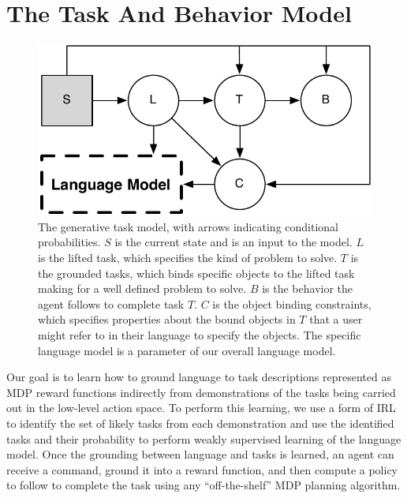 \documentclass[conference]{IEEEtran}
\begin{document}
\section{The Task And Behavior Model}
\begin{figure}[tbp]
\begin{center}
\includegraphics[width=.7\columnwidth]{images/taskModel}
\caption{The generative task model, with arrows indicating conditional probabilities. $S$ is the current state and is an input to the model. $L$ is the lifted task, which specifies the kind of problem to solve. $T$ is the grounded tasks, which binds specific objects to the lifted task making for a well defined problem to solve. $B$ is the behavior the agent follows to complete task $T$. $C$ is the object binding constraints, which specifies properties about the bound objects in $T$ that a user might refer to in their language to specify the objects. The specific language model is a parameter of our overall language model.}
\label{fig:tm}
\end{center}
\end{figure}
Our goal is to learn how to ground language to task descriptions represented as MDP reward functions indirectly from demonstrations of the tasks being carried out in the low-level action space. To perform this learning, we use a form of IRL to identify the set of likely tasks from each demonstration and use the identified tasks and their probability to perform weakly supervised learning of the language model. Once the grounding between language and tasks is learned, an agent can receive a command, ground it into a reward function, and then compute a policy to follow to complete the task using any ``off-the-shelf'' MDP planning algorithm.
\end{document}
